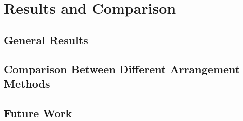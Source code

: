 
\chapter{Results and Comparison} %

\label{Chapter5} %


\section{General Results}


\section{Comparison Between Different Arrangement Methods}


\section{Future Work}